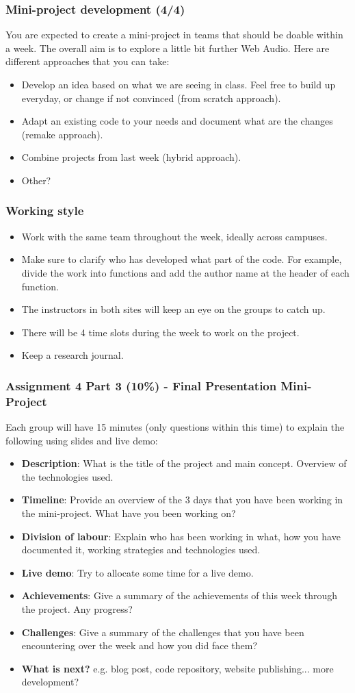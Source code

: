 \documentclass[screen, aspectratio=43]{beamer}
\begin{document}
%
\begin{frame}
\frametitle{Mini-project development (4/4)}
You are expected to create a mini-project in teams that should be doable within a week. The overall aim is to explore a little bit further Web Audio. Here are different approaches that you can take:
\begin{itemize}
\item Develop an idea based on what we are seeing in class. Feel free to build up everyday, or change if not convinced (from scratch approach).
\item Adapt an existing code to your needs and document what are the changes (remake approach).
\item Combine projects from last week (hybrid approach).
\item Other?
\end{itemize}
\end{frame}
%
\begin{frame}
\frametitle{Working style}
\begin{itemize}
\item Work with the same team throughout the week, ideally across campuses. 
\item Make sure to clarify who has developed what part of the code. For example, divide the work into functions and add the author name at the header of each function.
\item The instructors in both sites will keep an eye on the groups to catch up.
\item There will be 4 time slots during the week to work on the project. 
\item Keep a research journal.
\end{itemize}
\end{frame}
%
\begin{frame}
\frametitle{Assignment 4 Part 3 (10\%) - Final Presentation Mini-Project}
Each group will have 15 minutes (only questions within this time) to explain the following using slides and live demo:
\begin{itemize}
\item \textbf{Description}: What is the title of the project and main concept. Overview of the technologies used.
\item \textbf{Timeline}: Provide an overview of the 3 days that you have been working in the mini-project. What have you been working on?
\item \textbf{Division of labour}: Explain who has been working in what, how you have documented it, working strategies and technologies used.
\item  \textbf{Live demo}: Try to allocate some time for a live demo.
\item \textbf{Achievements}: Give a summary of the achievements of this week through the project. Any progress?
\item \textbf{Challenges}: Give a summary of the challenges that you have been encountering over the week and how you did face them?
\item \textbf{What is next?} e.g. blog post, code repository, website publishing... more development?
\end{itemize}
\end{frame}
\end{document}
